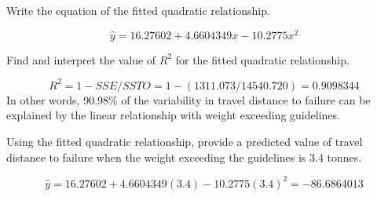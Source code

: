 \documentclass{examsetup}\usepackage[]{graphicx}\usepackage[]{color}
\begin{document}
\begin{questions}
\begin{parts}
   \begin{subparts}
      \subpart[5] Write the equation of the fitted quadratic relationship. 
      \begin{solution}
      $$
      \hat{y} = 16.27602 + 4.6604349 x - 10.2775 x^2
      $$
      \end{solution}
      \subpart[5] Find and interpret the value of $R^2$ for the fitted quadratic relationship.
      \begin{solution}
      $$
      R^2 = 1 - SSE/SSTO = 1 - (1311.073/14540.720) = 0.9098344
      $$
      In other words, 90.98\% of the variability in travel distance to failure can be explained by the linear relationship with weight exceeding guidelines.
      \end{solution}
      \subpart[5] Using the fitted quadratic relationship, provide a predicted value of travel distance to failure when the weight exceeding the guidelines is 3.4 tonnes.
      \begin{solution}
      $$
         \hat{y} = 16.27602 + 4.6604349 (3.4) - 10.2775 (3.4)^2 = -86.6864013
      $$
      \end{solution}

   \end{subparts}
\end{parts}

\end{questions}
\end{document}
